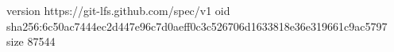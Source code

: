 version https://git-lfs.github.com/spec/v1
oid sha256:6c50ac7444ec2d447e96c7d0aeff0c3c526706d1633818e36e319661c9ac5797
size 87544
